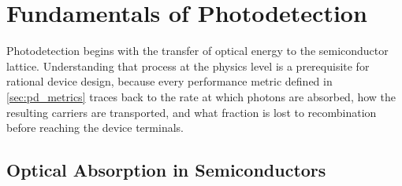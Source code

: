 
\section[Fundamentals of Photodetection]{Fundamentals of Photodetection}
\label{sec:pd_fundamentals}

Photodetection begins with the transfer of optical energy to the semiconductor
lattice. Understanding that process at the physics level is a prerequisite for
rational device design, because every performance metric defined in
\cref{sec:pd_metrics} traces back to the rate at which photons are absorbed,
how the resulting carriers are transported, and what fraction is lost to
recombination before reaching the device terminals.

\subsection[Optical Absorption in Semiconductors]{Optical Absorption in Semiconductors}
\label{subsec:pd_maxwell}

